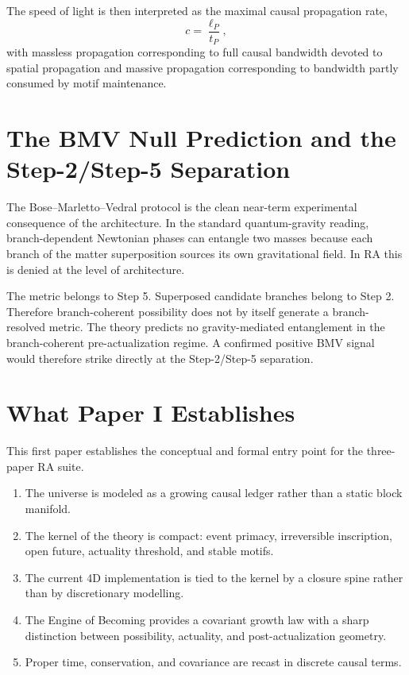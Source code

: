 \documentclass[11pt]{article}
\begin{document}
The speed of light is then interpreted as the maximal causal propagation rate,
\begin{equation}
c=\frac{\ell_P}{t_P},
\end{equation}
with massless propagation corresponding to full causal bandwidth devoted to spatial propagation and massive propagation corresponding to bandwidth partly consumed by motif maintenance.

\section{The BMV Null Prediction and the Step-2/Step-5 Separation}
The Bose--Marletto--Vedral protocol is the clean near-term experimental consequence of the architecture. In the standard quantum-gravity reading, branch-dependent Newtonian phases can entangle two masses because each branch of the matter superposition sources its own gravitational field. In RA this is denied at the level of architecture.

The metric belongs to Step 5. Superposed candidate branches belong to Step 2. Therefore branch-coherent possibility does not by itself generate a branch-resolved metric. The theory predicts no gravity-mediated entanglement in the branch-coherent pre-actualization regime. A confirmed positive BMV signal would therefore strike directly at the Step-2/Step-5 separation.

\section{What Paper I Establishes}
This first paper establishes the conceptual and formal entry point for the three-paper RA suite.
\begin{enumerate}[label=\arabic*.]
    \item The universe is modeled as a growing causal ledger rather than a static block manifold.
    \item The kernel of the theory is compact: event primacy, irreversible inscription, open future, actuality threshold, and stable motifs.
    \item The current 4D implementation is tied to the kernel by a closure spine rather than by discretionary modelling.
    \item The Engine of Becoming provides a covariant growth law with a sharp distinction between possibility, actuality, and post-actualization geometry.
    \item Proper time, conservation, and covariance are recast in discrete causal terms.
\end{enumerate}
\end{document}
